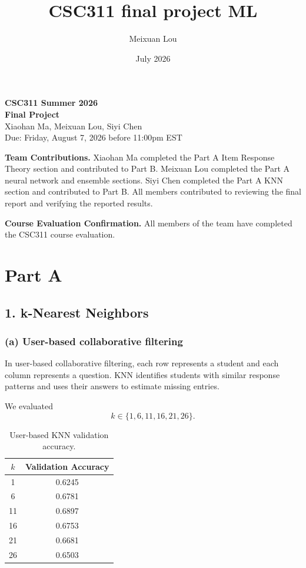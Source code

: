 \documentclass[11pt, letterpaper]{article}
\title{CSC311 final project ML}
\author{Meixuan Lou}
\date{July 2026}
\begin{document}
\begin{center}
    {\LARGE \textbf{CSC311 Summer 2026}} \\[0.5em]
    {\large \textbf{Final Project}} \\[0.5em]
    {\normalsize Xiaohan Ma, Meixuan Lou, Siyi Chen} \\
    {\normalsize Due: Friday, August 7, 2026 before 11:00pm EST}
\end{center}
\vspace{1em}
\noindent\textbf{Team Contributions.}
Xiaohan Ma completed the Part A Item Response Theory section and contributed to Part B.
Meixuan Lou completed the Part A neural network and ensemble sections.
Siyi Chen completed the Part A KNN section and contributed to Part B.
All members contributed to reviewing the final report and verifying the reported results.

\noindent\textbf{Course Evaluation Confirmation.}
All members of the team have completed the CSC311 course evaluation.
\section*{Part A}
 
\subsection*{1. k-Nearest Neighbors}

\subsubsection*{(a) User-based collaborative filtering}

In user-based collaborative filtering, each row represents a student and each column represents a question. KNN identifies students with similar response patterns and uses their answers to estimate missing entries.

We evaluated
\[
k \in \{1,6,11,16,21,26\}.
\]

\begin{table}[H]
    \centering
    \begin{tabular}{cc}
        \toprule
        $k$ & Validation Accuracy \\
        \midrule
        1  & 0.6245 \\
        6  & 0.6781 \\
        11 & 0.6897 \\
        16 & 0.6753 \\
        21 & 0.6681 \\
        26 & 0.6503 \\
        \bottomrule
    \end{tabular}
    \caption{User-based KNN validation accuracy.}
    \label{tab:user_knn}
\end{table}
\end{document}
